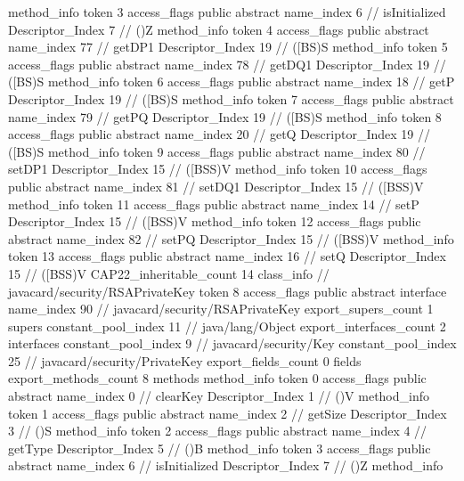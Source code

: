 {{{{{				}
				method_info {
					token	3
					access_flags	public abstract
					name_index	6		// isInitialized
					Descriptor_Index	7		// ()Z
				}
				method_info {
					token	4
					access_flags	public abstract
					name_index	77		// getDP1
					Descriptor_Index	19		// ([BS)S
				}
				method_info {
					token	5
					access_flags	public abstract
					name_index	78		// getDQ1
					Descriptor_Index	19		// ([BS)S
				}
				method_info {
					token	6
					access_flags	public abstract
					name_index	18		// getP
					Descriptor_Index	19		// ([BS)S
				}
				method_info {
					token	7
					access_flags	public abstract
					name_index	79		// getPQ
					Descriptor_Index	19		// ([BS)S
				}
				method_info {
					token	8
					access_flags	public abstract
					name_index	20		// getQ
					Descriptor_Index	19		// ([BS)S
				}
				method_info {
					token	9
					access_flags	public abstract
					name_index	80		// setDP1
					Descriptor_Index	15		// ([BSS)V
				}
				method_info {
					token	10
					access_flags	public abstract
					name_index	81		// setDQ1
					Descriptor_Index	15		// ([BSS)V
				}
				method_info {
					token	11
					access_flags	public abstract
					name_index	14		// setP
					Descriptor_Index	15		// ([BSS)V
				}
				method_info {
					token	12
					access_flags	public abstract
					name_index	82		// setPQ
					Descriptor_Index	15		// ([BSS)V
				}
				method_info {
					token	13
					access_flags	public abstract
					name_index	16		// setQ
					Descriptor_Index	15		// ([BSS)V
				}
			}
			CAP22_inheritable_count	14
		}
		class_info {		// javacard/security/RSAPrivateKey
			token	8
			access_flags	public abstract interface
			name_index	90		// javacard/security/RSAPrivateKey
			export_supers_count	1
			supers {
				constant_pool_index	11		// java/lang/Object
			}
			export_interfaces_count	2
			interfaces {
				constant_pool_index	9		// javacard/security/Key
				constant_pool_index	25		// javacard/security/PrivateKey
			}
			export_fields_count	0
			fields {
			}
			export_methods_count	8
			methods {
				method_info {
					token	0
					access_flags	public abstract
					name_index	0		// clearKey
					Descriptor_Index	1		// ()V
				}
				method_info {
					token	1
					access_flags	public abstract
					name_index	2		// getSize
					Descriptor_Index	3		// ()S
				}
				method_info {
					token	2
					access_flags	public abstract
					name_index	4		// getType
					Descriptor_Index	5		// ()B
				}
				method_info {
					token	3
					access_flags	public abstract
					name_index	6		// isInitialized
					Descriptor_Index	7		// ()Z
				}
				method_info {
}}}}}
